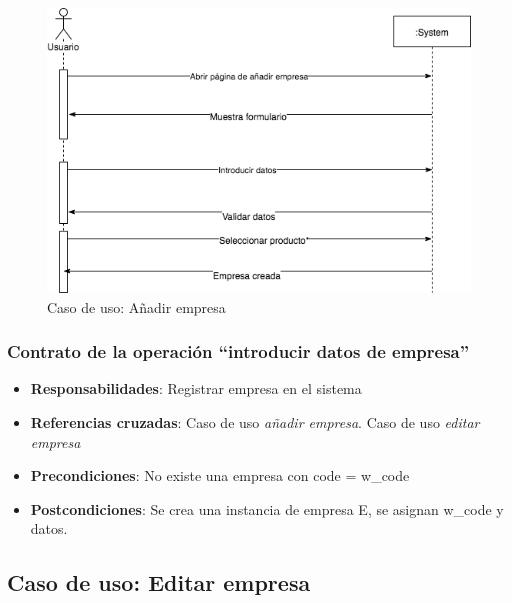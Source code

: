 \documentclass[12pt,a4paperpaper,]{report}
\providecommand{\tightlist}{%
  \setlength{\itemsep}{0pt}\setlength{\parskip}{0pt}}
\begin{document}
\begin{figure}
\centering
\includegraphics{source/figures/secuencia-anadir-empresa.png}
\caption{Caso de uso: Añadir empresa \label{secuencia_anadir_empresa}}
\end{figure}

\subsubsection{\texorpdfstring{Contrato de la operación ``introducir
datos de
empresa''}{Contrato de la operación introducir datos de empresa}}\label{contrato-de-la-operaciuxf3n-introducir-datos-de-empresa}

\begin{itemize}
\tightlist
\item
  \textbf{Responsabilidades}: Registrar empresa en el sistema
\item
  \textbf{Referencias cruzadas}: Caso de uso \emph{añadir empresa}. Caso
  de uso \emph{editar empresa}
\item
  \textbf{Precondiciones}: No existe una empresa con code = w\_code
\item
  \textbf{Postcondiciones}: Se crea una instancia de empresa E, se
  asignan w\_code y datos.
\end{itemize}

\subsection{Caso de uso: Editar
empresa}\label{caso-de-uso-editar-empresa-1}
\end{document}
